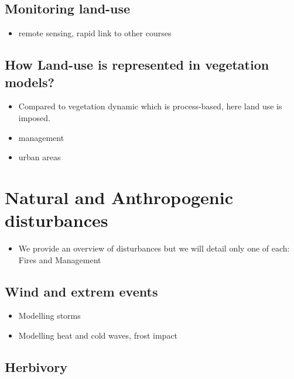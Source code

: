 \documentclass[12pt,oneside]{book}
\providecommand{\tightlist}{%
  \setlength{\itemsep}{0pt}\setlength{\parskip}{0pt}}
\begin{document}
\subsection{Monitoring land-use}\label{monitoring-land-use}

\begin{itemize}
\tightlist
\item
  remote sensing, rapid link to other courses
\end{itemize}

\subsection{How Land-use is represented in vegetation
models?}\label{how-land-use-is-represented-in-vegetation-models}

\begin{itemize}
\tightlist
\item
  Compared to vegetation dynamic which is process-based, here land use
  is imposed.
\item
  management
\item
  urban areas
\end{itemize}

\section{Natural and Anthropogenic
disturbances}\label{natural-and-anthropogenic-disturbances}

\begin{itemize}
\tightlist
\item
  We provide an overview of disturbances but we will detail only one of
  each: Fires and Management
\end{itemize}

\subsection{Wind and extrem events}\label{wind-and-extrem-events}

\begin{itemize}
\tightlist
\item
  Modelling storms
\item
  Modelling heat and cold waves, frost impact
\end{itemize}

\subsection{Herbivory}\label{herbivory}
\end{document}
